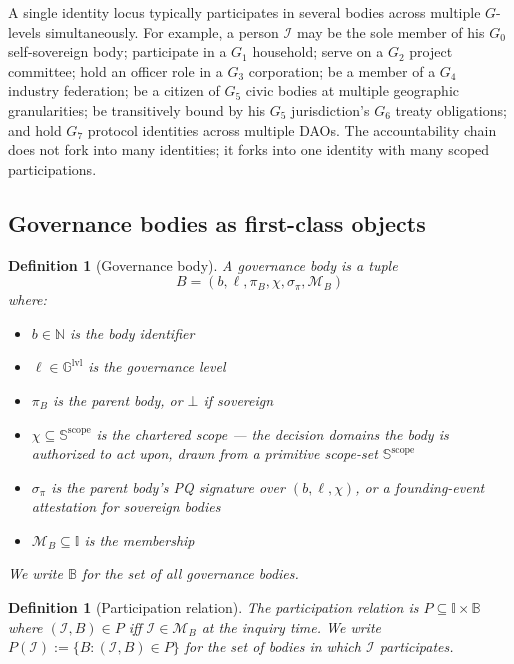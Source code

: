 \documentclass[11pt,a4paper,parskip=half-,DIV=12,headings=standardclasses]{scrartcl}
\theoremstyle{ncthm}
\theoremstyle{ncdef}
\newtheorem{definition}[theorem]{Definition}
\newcommand{\identity}{\mathcal{I}}
\begin{document}
A single identity locus typically participates in several bodies
across multiple $G$-levels simultaneously. For example, a person
$\identity$ may be the sole member of his $G_0$ self-sovereign body;
participate in a $G_1$ household; serve on a $G_2$ project committee;
hold an officer role in a $G_3$ corporation; be a member of a $G_4$
industry federation; be a citizen of $G_5$ civic bodies at
multiple geographic granularities; be transitively bound by his $G_5$
jurisdiction's $G_6$ treaty obligations; and hold $G_7$
protocol identities across multiple DAOs. The accountability chain
does not fork into many identities; it forks into one identity with
many scoped participations.

\subsection{Governance bodies as first-class objects}

\begin{definition}[Governance body]\label{def:governance-body}
A \emph{governance body} is a tuple
\[
B = (b, \ell, \pi_B, \chi, \sigma_\pi, \mathcal{M}_B)
\]
where:
\begin{itemize}
\item $b \in \mathbb{N}$ is the body identifier
\item $\ell \in \mathbb{G}^{\mathrm{lvl}}$ is the governance level
\item $\pi_B$ is the parent body, or $\bot$ if sovereign
\item $\chi \subseteq \mathbb{S}^{\mathrm{scope}}$ is the
  \emph{chartered scope} --- the decision domains the body is
  authorized to act upon, drawn from a primitive scope-set
  $\mathbb{S}^{\mathrm{scope}}$
\item $\sigma_\pi$ is the parent body's PQ signature over
  $(b, \ell, \chi)$, or a founding-event attestation for sovereign
  bodies
\item $\mathcal{M}_B \subseteq \mathbb{I}$ is the membership
\end{itemize}
We write $\mathbb{B}$ for the set of all governance bodies.
\end{definition}

\begin{definition}[Participation relation]\label{def:participation}
The \emph{participation relation} is
$P \subseteq \mathbb{I} \times \mathbb{B}$ where
$(\identity, B) \in P$ iff $\identity \in \mathcal{M}_B$ at the
inquiry time. We write $P(\identity) := \{B : (\identity, B) \in P\}$
for the set of bodies in which $\identity$ participates.
\end{definition}
\end{document}
